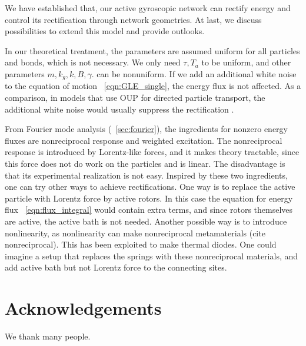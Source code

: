 \documentclass[
 preprint,
 preprintnumbers,
 amsmath,amssymb,
 aps,
 pre,
 longbibliography,
 superscriptaddress,
 10pt, twocolumn
]{revtex4-1}
\begin{document}
We have established that, our active gyroscopic network can rectify energy and control its rectification through network geometries.
At last, we discuss possibilities to extend this model and provide outlooks.

In our theoretical treatment, the parameters are assumed uniform for all particles and bonds, which is not necessary. We only need $\tau,T_a$ to be uniform, and other parameters $m, k_g, k, B, \gamma$. can be nonuniform.
If we add an additional white noise to the equation of motion \eqnname~\eqref{eqn:GLE_single}, the energy flux is not affected. As a comparison, in models that use OUP for directed particle transport, the additional white noise would usually suppress the rectification \cite{Bartussek1996PreciseNumerics}.

From Fourier mode analysis (\secname~\ref{sec:fourier}), the ingredients for nonzero energy fluxes are nonreciprocal response and weighted excitation.
The nonreciprocal response is introduced by Lorentz-like forces, and it makes theory tractable, since this force does not do work on the particles and is linear. The disadvantage is that its experimental realization is not easy.
Inspired by these two ingredients, one can try other ways to achieve rectifications.
One way is to replace the active particle with Lorentz force by active rotors. In this case the equation for energy flux \eqnname~\eqref{eqn:flux_integral} would contain extra terms, and since rotors themselves are active, the active bath is not needed.
Another possible way is to introduce nonlinearity, as nonlinearity can make nonreciprocal metamaterials  (cite nonreciprocal). This has been exploited to make thermal diodes. One could imagine a setup that replaces the springs with these nonreciprocal materials, and add active bath but not Lorentz force to the connecting sites.



\section*{Acknowledgements}
We thank many people.



\end{document}
